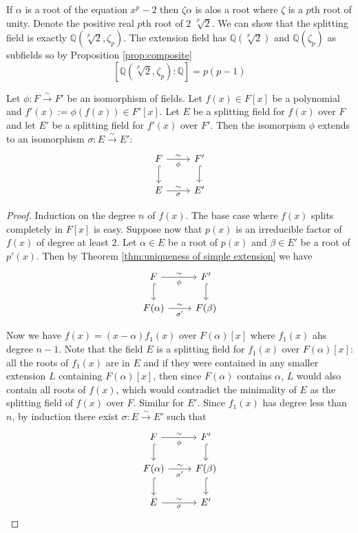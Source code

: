 \documentclass[a4paper]{article}
\begin{document}
\begin{eg}
  If $\alpha$ is a root of the equation $x^p-2$ then $\zeta\alpha$ is alos a root where $\zeta$ is a $p$th root of unity. Denote the positive real $p$th root of $2$ $\sqrt[p]2$. We can show that the splitting field is exactly $\mathbb{Q}(\sqrt[p]2, \zeta_p)$. The extension field has $\mathbb{Q}(\sqrt[p]2)$ and $\mathbb{Q}(\zeta_p)$ as subfields so by Proposition \ref{prop:composite}
  \[ [\mathbb{Q}(\sqrt[p]2,\zeta_p):\mathbb{Q}] = p(p-1) \]
\end{eg}

\begin{thm}
  Let $\phi: F\xrightarrow{\sim} F'$ be an isomorphism of fields. Let $f(x)\in F[x]$ be a polynomial and $f'(x):=\phi(f(x))\in F'[x]$. Let $E$ be a splitting field for $f(x)$ over $F$ and let $E'$ be a splitting field for $f'(x)$ over $F'$. Then the isomorpism $\phi$ extends to an isomorphism $\sigma:E\xrightarrow{\sim} E'$:
  \[
    \begin{tikzcd}
      F \arrow{r}{\sim}[swap]{\phi} \arrow[hook]{d} & F' \arrow[hook]{d}\\
      E \arrow{r}{\sim}[swap]{\sigma} & E'
    \end{tikzcd}
  \]
\end{thm}

\begin{proof}
  Induction on the degree $n$ of $f(x)$. The base case where $f(x)$ splits completely in $F[x]$ is easy. Suppose now that $p(x)$ is an irreducible factor of $f(x)$ of degree at least $2$. Let $\alpha\in E$ be a root of $p(x)$ and $\beta\in E'$ be a root of $p'(x)$. Then by Theorem \ref{thm:uniqueness of simple extension} we have
  \[
    \begin{tikzcd}
      F \arrow{r}{\sim}[swap]{\phi} \arrow[hook]{d} & F' \arrow[hook]{d}\\
      F(\alpha) \arrow{r}{\sim}[swap]{\sigma'} & F(\beta)
    \end{tikzcd}
  \]

  Now we have $f(x) = (x-\alpha)f_1(x)$ over $F(\alpha)[x]$ where $f_1(x)$ ahs degree $n-1$. Note that the field $E$ is a splitting field for $f_1(x)$ over $F(\alpha)[x]$: all the roots of $f_1(x)$ are in $E$ and if they were contained in any smaller extension $L$ containing $F(\alpha)[x]$, then since $F(\alpha)$ contains $\alpha$, $L$ would also contain all roots of $f(x)$, which would contradict the minimality of $E$ as the splitting field of $f(x)$ over $F$. Similar for $E'$. Since $f_1(x)$ has degree less than $n$, by induction there exist $\sigma: E\xrightarrow{\sim} E'$ such that
  \[
    \begin{tikzcd}
      F \arrow{r}{\sim}[swap]{\phi} \arrow[hook]{d} & F' \arrow[hook]{d}\\
      F(\alpha) \arrow{r}{\sim}[swap]{\sigma'} \arrow[hook]{d} & F(\beta) \arrow[hook]{d}\\
      E \arrow{r}{\sim}[swap]{\sigma} & E'
    \end{tikzcd}
  \]
\end{proof}
\end{document}

